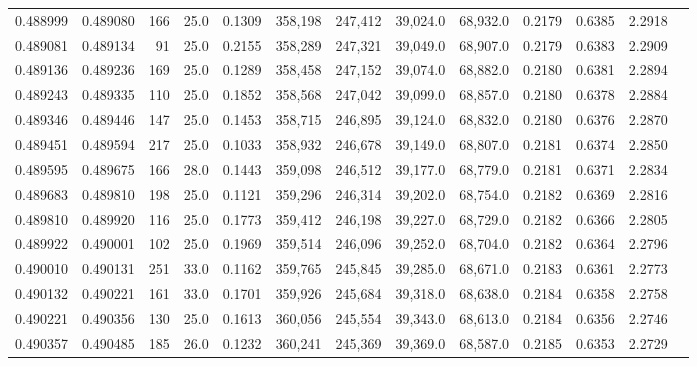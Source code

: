 \begin{tabular}{rrrrrrrrrrrrr}
0.488999 & 0.489080 &   166 & 25.0 &                                     0.1309 & 358,198 & 247,412 &  39,024.0 &  68,932.0 & 0.2179 & 0.6385 & 2.2918 \\
0.489081 & 0.489134 &    91 & 25.0 &                                     0.2155 & 358,289 & 247,321 &  39,049.0 &  68,907.0 & 0.2179 & 0.6383 & 2.2909 \\
0.489136 & 0.489236 &   169 & 25.0 &                                     0.1289 & 358,458 & 247,152 &  39,074.0 &  68,882.0 & 0.2180 & 0.6381 & 2.2894 \\
0.489243 & 0.489335 &   110 & 25.0 &                                     0.1852 & 358,568 & 247,042 &  39,099.0 &  68,857.0 & 0.2180 & 0.6378 & 2.2884 \\
0.489346 & 0.489446 &   147 & 25.0 &                                     0.1453 & 358,715 & 246,895 &  39,124.0 &  68,832.0 & 0.2180 & 0.6376 & 2.2870 \\
0.489451 & 0.489594 &   217 & 25.0 &                                     0.1033 & 358,932 & 246,678 &  39,149.0 &  68,807.0 & 0.2181 & 0.6374 & 2.2850 \\
0.489595 & 0.489675 &   166 & 28.0 &                                     0.1443 & 359,098 & 246,512 &  39,177.0 &  68,779.0 & 0.2181 & 0.6371 & 2.2834 \\
0.489683 & 0.489810 &   198 & 25.0 &                                     0.1121 & 359,296 & 246,314 &  39,202.0 &  68,754.0 & 0.2182 & 0.6369 & 2.2816 \\
0.489810 & 0.489920 &   116 & 25.0 &                                     0.1773 & 359,412 & 246,198 &  39,227.0 &  68,729.0 & 0.2182 & 0.6366 & 2.2805 \\
0.489922 & 0.490001 &   102 & 25.0 &                                     0.1969 & 359,514 & 246,096 &  39,252.0 &  68,704.0 & 0.2182 & 0.6364 & 2.2796 \\
0.490010 & 0.490131 &   251 & 33.0 &                                     0.1162 & 359,765 & 245,845 &  39,285.0 &  68,671.0 & 0.2183 & 0.6361 & 2.2773 \\
0.490132 & 0.490221 &   161 & 33.0 &                                     0.1701 & 359,926 & 245,684 &  39,318.0 &  68,638.0 & 0.2184 & 0.6358 & 2.2758 \\
0.490221 & 0.490356 &   130 & 25.0 &                                     0.1613 & 360,056 & 245,554 &  39,343.0 &  68,613.0 & 0.2184 & 0.6356 & 2.2746 \\
0.490357 & 0.490485 &   185 & 26.0 &                                     0.1232 & 360,241 & 245,369 &  39,369.0 &  68,587.0 & 0.2185 & 0.6353 & 2.2729 \\

\end{tabular}
